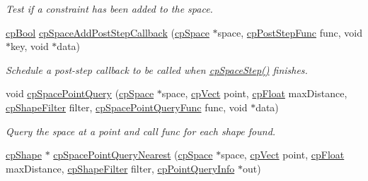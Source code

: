 \begin{DoxyCompactItemize}
\begin{DoxyCompactList}\small\item\em Test if a constraint has been added to the space. \end{DoxyCompactList}\item 
\hyperlink{group__basic_types_gabc5e752c48f3449ca26ef413ecbd647e}{cp\+Bool} \hyperlink{group__cp_space_gae59563596af1bae44c2de59871cde5f8}{cp\+Space\+Add\+Post\+Step\+Callback} (\hyperlink{structcp_space}{cp\+Space} $\ast$space, \hyperlink{group__cp_space_ga93e9005e387fec86eeb4a225ac295a23}{cp\+Post\+Step\+Func} func, void $\ast$key, void $\ast$data)
\begin{DoxyCompactList}\small\item\em Schedule a post-\/step callback to be called when \hyperlink{group__cp_space_gad8a6c8e7e99ae268af224aa199124706}{cp\+Space\+Step()} finishes. \end{DoxyCompactList}\item 
\hypertarget{group__cp_space_gaef2748612847147c8eb496470ccd1611}{}void \hyperlink{group__cp_space_gaef2748612847147c8eb496470ccd1611}{cp\+Space\+Point\+Query} (\hyperlink{structcp_space}{cp\+Space} $\ast$space, \hyperlink{structcp_vect}{cp\+Vect} point, \hyperlink{group__basic_types_gac1ed65573e035bf892505768c852d8d3}{cp\+Float} max\+Distance, \hyperlink{structcp_shape_filter}{cp\+Shape\+Filter} filter, \hyperlink{group__cp_space_ga646a55f0937f07c19b24561ed5341221}{cp\+Space\+Point\+Query\+Func} func, void $\ast$data)\label{group__cp_space_gaef2748612847147c8eb496470ccd1611}

\begin{DoxyCompactList}\small\item\em Query the space at a point and call {\ttfamily func} for each shape found. \end{DoxyCompactList}\item 
\hypertarget{group__cp_space_gad333bad8f98d532657ae7cdc57a18a4a}{}\hyperlink{structcp_shape}{cp\+Shape} $\ast$ \hyperlink{group__cp_space_gad333bad8f98d532657ae7cdc57a18a4a}{cp\+Space\+Point\+Query\+Nearest} (\hyperlink{structcp_space}{cp\+Space} $\ast$space, \hyperlink{structcp_vect}{cp\+Vect} point, \hyperlink{group__basic_types_gac1ed65573e035bf892505768c852d8d3}{cp\+Float} max\+Distance, \hyperlink{structcp_shape_filter}{cp\+Shape\+Filter} filter, \hyperlink{structcp_point_query_info}{cp\+Point\+Query\+Info} $\ast$out)\label{group__cp_space_gad333bad8f98d532657ae7cdc57a18a4a}


\end{DoxyCompactItemize}
